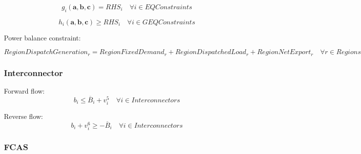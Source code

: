 \documentclass{article}
\begin{document}
\begin{equation}
	g_{i}(\bm{a}, \bm{b}, \bm{c}) = RHS_{i} \quad \forall i \in EQConstraints
\end{equation}

\begin{equation}
	h_{i}(\bm{a}, \bm{b}, \bm{c}) \geq RHS_{i} \quad \forall i \in GEQConstraints
\end{equation}

Power balance constraint:

\begin{equation}
	RegionDispatchGeneration_{r} = RegionFixedDemand_{r} + RegionDispatchedLoad_{r} + RegionNetExport_{r} \quad \forall r \in Regions
\end{equation}

\subsubsection{Interconnector}
Forward flow:
\begin{equation}
	b_{i} \leq \overline{B}_{i} + v^{5}_{i} \quad \forall i \in Interconnectors
\end{equation}

Reverse flow:
\begin{equation}
b_{i} + v^{6}_{i} \geq - \overline{B}_{i} \quad \forall i \in Interconnectors
\end{equation}


\subsubsection{FCAS}
%
%
%
%
%
\end{document}
